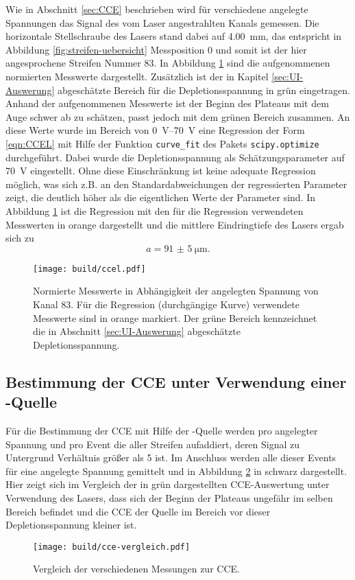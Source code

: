 Wie in Abschnitt \ref{sec:CCE} beschrieben wird für verschiedene angelegte Spannungen
das Signal des vom Laser angestrahlten Kanals gemessen.
Die horizontale Stellschraube des Lasers stand dabei auf \SI{4.00}{\milli\meter},
das entspricht in Abbildung \ref{fig:streifen-uebersicht} Messposition \num{0}
und somit ist der hier angesprochene Streifen Nummer \num{83}.
In Abbildung \ref{fig:ccel} sind die aufgenommenen normierten Messwerte dargestellt.
Zusätzlich ist der in Kapitel \ref{sec:UI-Auswerung} abgeschätzte Bereich für die
Depletionsspannung in grün eingetragen.
Anhand der aufgenommenen Messwerte ist der Beginn des Plateaus mit dem Auge schwer
ab zu schätzen, passt jedoch mit dem grünen Bereich zusammen.
An diese Werte wurde im Bereich von \SIrange{0}{70}{\volt} eine Regression
der Form \eqref{eqn:CCEL} mit Hilfe der Funktion \texttt{curve\_fit} des Pakets
\texttt{scipy.optimize} durchgeführt.
Dabei wurde die Depletionsspannung als Schätzungsparameter auf \SI{70}{\volt}
eingestellt. Ohne diese Einschränkung ist keine adequate Regression möglich,
was sich z.B. an den Standardabweichungen der regressierten Parameter zeigt,
die deutlich höher als die eigentlichen Werte der Parameter sind.
In Abbildung \ref{fig:ccel} ist die Regression mit den für die Regression verwendeten
Messwerten in orange dargestellt und die mittlere Eindringtiefe des Lasers
ergab sich zu
\begin{equation*}
  a = \SI{91(5)}{\micro\meter}.
\end{equation*}
\begin{figure}
  \centering
  \texttt{[image: build/ccel.pdf]}  %
  \caption{Normierte Messwerte in Abhängigkeit der angelegten Spannung von Kanal
  83. Für die Regression (durchgängige Kurve) verwendete Messwerte sind in orange markiert.
  Der grüne Bereich kennzeichnet die in Abschnitt \ref{sec:UI-Auswerung} abgeschätzte
  Depletionsspannung.}
  \label{fig:ccel}
\end{figure}

\FloatBarrier
\subsection{Bestimmung der CCE unter Verwendung einer \texorpdfstring{}{Sr}-Quelle}
\label{sec:CCEQ-Auswertung}

Für die Bestimmung der CCE mit Hilfe der -Quelle werden pro angelegter
Spannung und pro Event die \si{\adc} aller Streifen aufaddiert, deren
Signal zu Untergrund Verhältnis größer als \num{5} ist.
Im Anschluss werden alle dieser Events für eine angelegte Spannung gemittelt und
in Abbildung \ref{fig:cce-vergleich} in schwarz dargestellt.
Hier zeigt sich im Vergleich der in grün dargestellten CCE-Auswertung unter
Verwendung des Lasers, dass sich der Beginn der Plateaus ungefähr im selben Bereich
befindet und die CCE der Quelle im Bereich vor dieser Depletionsspannung kleiner
ist.
\begin{figure}
  \centering
  \texttt{[image: build/cce-vergleich.pdf]}  %
  \caption{Vergleich der verschiedenen Messungen zur CCE.}
  \label{fig:cce-vergleich}
\end{figure}


